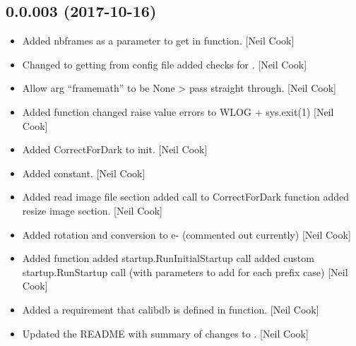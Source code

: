 \documentclass[a4paper,10pt,english]{report}
\begin{document}
\subsection{0.0.003 (2017-10-16)}
\label{\detokenize{misc/changelog:id547}}\begin{itemize}
\item {} 
Added nbframes as a parameter to get in  function. {[}Neil
Cook{]}

\item {} 
Changed  to getting from config file added checks for
. {[}Neil Cook{]}

\item {} 
Allow  arg “framemath” to be None \textendash{}\textgreater{} pass straight
through. {[}Neil Cook{]}

\item {} 
Added  function changed raise value errors to WLOG +
sys.exit(1) {[}Neil Cook{]}

\item {} 
Added CorrectForDark to init. {[}Neil Cook{]}

\item {} 
Added  constant. {[}Neil Cook{]}

\item {} 
Added read image file section added call to CorrectForDark function
added resize image section. {[}Neil Cook{]}

\item {} 
Added rotation and conversion to e- (commented out currently) {[}Neil
Cook{]}

\item {} 
Added  function added startup.RunInitialStartup call added
custom startup.RunStartup call (with parameters to add for each prefix
case) {[}Neil Cook{]}

\item {} 
Added a requirement that calibdb is defined in  function.
{[}Neil Cook{]}

\item {} 
Updated the README with summary of changes to .
{[}Neil Cook{]}

\end{itemize}
\end{document}
